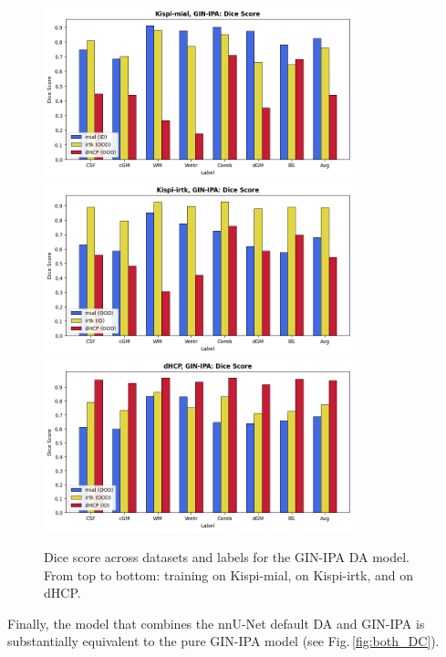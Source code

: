 \begin{figure}[htbp]
    \centering
    \includegraphics[width=0.8\textwidth]{figures/mial_ginipa_DC.png}\\
    \vspace{10pt}
    \includegraphics[width=0.8\textwidth]{figures/irtk_ginipa_DC.png}\\
    \vspace{10pt}
    \includegraphics[width=0.8\textwidth]{figures/dHCP_ginipa_DC.png}
    \caption{Dice score across datasets and labels for the GIN-IPA DA model. From top to bottom: training on Kispi-mial, on Kispi-irtk, and on dHCP.}
    \label{fig:ginipa_DC}
\end{figure}

Finally, the model that combines the nnU-Net default DA and GIN-IPA is substantially equivalent to the pure GIN-IPA model (see Fig.\,\ref{fig:both_DC}).

